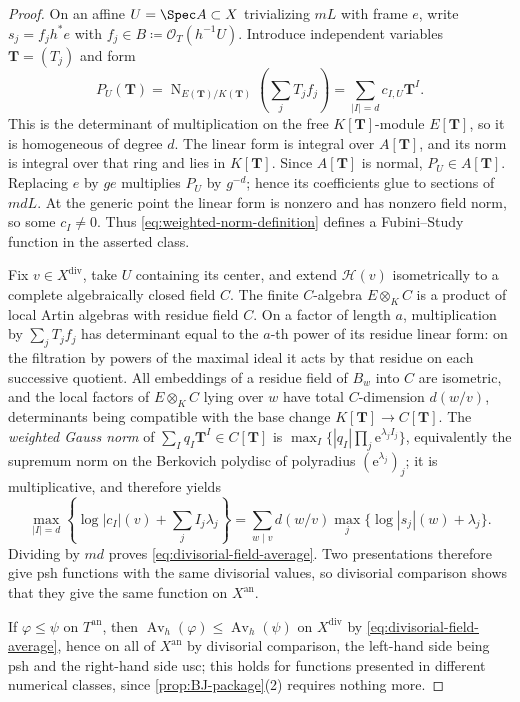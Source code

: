 \documentclass[11pt,a4paper]{article}
\newcommand{\an}{\mathrm{an}}          %
\newcommand{\divv}{\mathrm{div}}       %
\newcommand{\Norm}{\operatorname{N}}
\newcommand{\Av}{\operatorname{Av}}
\begin{document}
\begin{proof}
On an affine $U=\Spec A\subset X$ trivializing $mL$ with frame $e$, write $s_j=f_jh^*e$ with $f_j\in B\coloneqq\mathcal O_T(h^{-1}U)$. Introduce independent variables $\mathbf T=(T_j)$ and form
\[
 P_U(\mathbf T)
 =\Norm_{E(\mathbf T)/K(\mathbf T)}\left(\sum_jT_jf_j\right)
 =\sum_{|I|=d}c_{I,U}\mathbf T^I.
\]
This is the determinant of multiplication on the free $K[\mathbf T]$-module $E[\mathbf T]$, so it is homogeneous of degree $d$.  The linear form is integral over $A[\mathbf T]$, and its norm is integral over that ring and lies in $K[\mathbf T]$.  Since $A[\mathbf T]$ is normal, $P_U\in A[\mathbf T]$. Replacing $e$ by $ge$ multiplies $P_U$ by $g^{-d}$; hence its coefficients glue to sections of $mdL$.  At the generic point the linear form is nonzero and has nonzero field norm, so some $c_I\ne0$. Thus \eqref{eq:weighted-norm-definition} defines a Fubini--Study function in the asserted class.

Fix $v\in X^{\divv}$, take $U$ containing its center, and extend $\mathcal H(v)$ isometrically to a complete algebraically closed field $C$.  The finite $C$-algebra $E\otimes_K C$ is a product of local Artin algebras with residue field $C$.  On a factor of length $a$, multiplication by $\sum_jT_jf_j$ has determinant equal to the $a$-th power of its residue linear form: on the filtration by powers of the maximal ideal it acts by that residue on each successive quotient.  All embeddings of a residue field of $B_w$ into $C$ are isometric, and the local factors of $E\otimes_KC$ lying over $w$ have total $C$-dimension $d(w/v)$, determinants being compatible with the base change $K[\mathbf T]\to C[\mathbf T]$.  The \emph{weighted Gauss norm} of $\sum_Iq_I\mathbf T^I\in C[\mathbf T]$ is $\max_I\{|q_I|\prod_j\mathrm{e}^{\lambda_jI_j}\}$, equivalently the supremum norm on the Berkovich polydisc of polyradius $(\mathrm e^{\lambda_j})_j$; it is multiplicative, and therefore yields
\[
 \max_{|I|=d}\left\{\log|c_I|(v)+\sum_jI_j\lambda_j\right\}
 =\sum_{w\mid v}d(w/v)
       \max_j\{\log|s_j|(w)+\lambda_j\}.
\]
Dividing by $md$ proves \eqref{eq:divisorial-field-average}. Two presentations therefore give psh functions with the same divisorial values, so divisorial comparison shows that they give the same function on $X^{\an}$.

If $\varphi\leq\psi$ on $T^{\an}$, then $\Av_h(\varphi)\leq\Av_h(\psi)$ on $X^{\divv}$ by \eqref{eq:divisorial-field-average}, hence on all of $X^{\an}$ by divisorial comparison, the left-hand side being psh and the right-hand side usc; this holds for functions presented in different numerical classes, since \cref{prop:BJ-package}(2) requires nothing more.
\end{proof}
\end{document}
